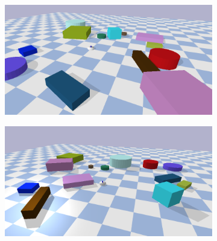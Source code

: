 \begin{figure}[H]
    \centering
    \begin{subfigure}{.49\textwidth}
    \centering
    \includegraphics[width=\textwidth]{figures/tests/random1}
    \end{subfigure}
    \hfill
    \begin{subfigure}{.49\textwidth}
    \centering
    \includegraphics[width=\textwidth]{figures/tests/random2}
    \end{subfigure}


\end{figure}
